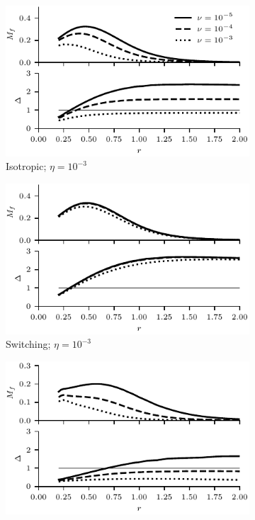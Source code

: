 \begin{figure}[h]
    \hfill
    \begin{subfigure}{0.49\textwidth}
      \centering
  \includegraphics[width=1.0\linewidth]{param_study/mach_numbers_eta_3_iso.pdf}
      \caption{Isotropic; $\eta = 10^{-3}$}%
      \label{fig:mach_numbers_eta_3_iso}
    \end{subfigure}
    \hfill
    \begin{subfigure}{0.49\textwidth}
      \centering
  \includegraphics[width=1.0\linewidth]{param_study/mach_numbers_eta_3_swi.pdf}
      \caption{Switching; $\eta = 10^{-3}$}%
      \label{fig:mach_numbers_eta_3_swi}
    \end{subfigure}
    \hfill
    \begin{subfigure}{0.49\textwidth}
      \centering
  \includegraphics[width=1.0\linewidth]{param_study/mach_numbers_eta_4_iso.pdf}

\end{subfigure}
\end{figure}
